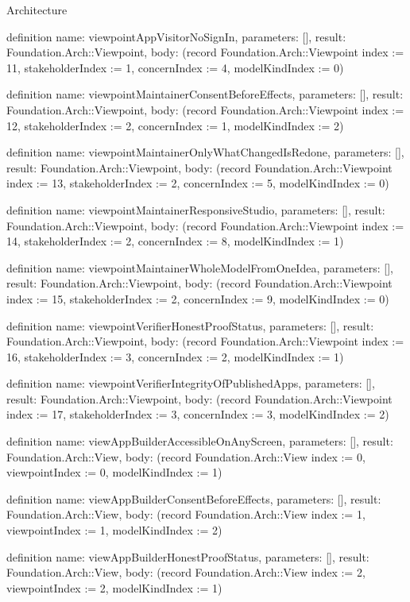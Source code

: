 \begin{lexlean}{Architecture}
\begin{semanticmodule}
definition{
  name: viewpointAppVisitorNoSignIn,
  parameters: [],
  result: Foundation.Arch::Viewpoint,
  body: (record Foundation.Arch::Viewpoint {index := 11, stakeholderIndex := 1, concernIndex := 4, modelKindIndex := 0})
}

definition{
  name: viewpointMaintainerConsentBeforeEffects,
  parameters: [],
  result: Foundation.Arch::Viewpoint,
  body: (record Foundation.Arch::Viewpoint {index := 12, stakeholderIndex := 2, concernIndex := 1, modelKindIndex := 2})
}

definition{
  name: viewpointMaintainerOnlyWhatChangedIsRedone,
  parameters: [],
  result: Foundation.Arch::Viewpoint,
  body: (record Foundation.Arch::Viewpoint {index := 13, stakeholderIndex := 2, concernIndex := 5, modelKindIndex := 0})
}

definition{
  name: viewpointMaintainerResponsiveStudio,
  parameters: [],
  result: Foundation.Arch::Viewpoint,
  body: (record Foundation.Arch::Viewpoint {index := 14, stakeholderIndex := 2, concernIndex := 8, modelKindIndex := 1})
}

definition{
  name: viewpointMaintainerWholeModelFromOneIdea,
  parameters: [],
  result: Foundation.Arch::Viewpoint,
  body: (record Foundation.Arch::Viewpoint {index := 15, stakeholderIndex := 2, concernIndex := 9, modelKindIndex := 0})
}

definition{
  name: viewpointVerifierHonestProofStatus,
  parameters: [],
  result: Foundation.Arch::Viewpoint,
  body: (record Foundation.Arch::Viewpoint {index := 16, stakeholderIndex := 3, concernIndex := 2, modelKindIndex := 1})
}

definition{
  name: viewpointVerifierIntegrityOfPublishedApps,
  parameters: [],
  result: Foundation.Arch::Viewpoint,
  body: (record Foundation.Arch::Viewpoint {index := 17, stakeholderIndex := 3, concernIndex := 3, modelKindIndex := 2})
}

definition{
  name: viewAppBuilderAccessibleOnAnyScreen,
  parameters: [],
  result: Foundation.Arch::View,
  body: (record Foundation.Arch::View {index := 0, viewpointIndex := 0, modelKindIndex := 1})
}

definition{
  name: viewAppBuilderConsentBeforeEffects,
  parameters: [],
  result: Foundation.Arch::View,
  body: (record Foundation.Arch::View {index := 1, viewpointIndex := 1, modelKindIndex := 2})
}

definition{
  name: viewAppBuilderHonestProofStatus,
  parameters: [],
  result: Foundation.Arch::View,
  body: (record Foundation.Arch::View {index := 2, viewpointIndex := 2, modelKindIndex := 1})
}


\end{semanticmodule}
\end{lexlean}
